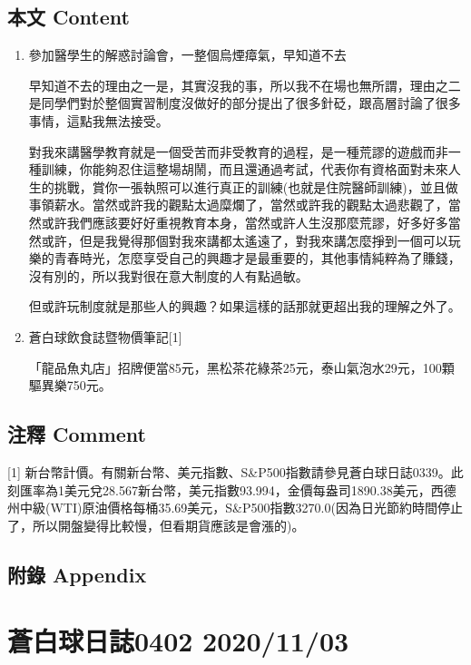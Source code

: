 \documentclass[
]{article}
\begin{document}
\hypertarget{ux672cux6587-content-1}{%
\subsection{本文 Content}\label{ux672cux6587-content-1}}

\begin{enumerate}
\def\labelenumi{\arabic{enumi}.}
\item
  參加醫學生的解惑討論會，一整個烏煙瘴氣，早知道不去

  早知道不去的理由之一是，其實沒我的事，所以我不在場也無所謂，理由之二是同學們對於整個實習制度沒做好的部分提出了很多針砭，跟高層討論了很多事情，這點我無法接受。

  對我來講醫學教育就是一個受苦而非受教育的過程，是一種荒謬的遊戲而非一種訓練，你能夠忍住這整場胡鬧，而且還通過考試，代表你有資格面對未來人生的挑戰，賞你一張執照可以進行真正的訓練(也就是住院醫師訓練)，並且做事領薪水。當然或許我的觀點太過糜爛了，當然或許我的觀點太過悲觀了，當然或許我們應該要好好重視教育本身，當然或許人生沒那麼荒謬，好多好多當然或許，但是我覺得那個對我來講都太遙遠了，對我來講怎麼掙到一個可以玩樂的青春時光，怎麼享受自己的興趣才是最重要的，其他事情純粹為了賺錢，沒有別的，所以我對很在意大制度的人有點過敏。

  但或許玩制度就是那些人的興趣？如果這樣的話那就更超出我的理解之外了。
\item
  蒼白球飲食誌暨物價筆記{[}1{]}

  「龍品魚丸店」招牌便當85元，黑松茶花綠茶25元，泰山氣泡水29元，100顆驅異樂750元。
\end{enumerate}

\hypertarget{ux6ce8ux91cb-comment-1}{%
\subsection{注釋 Comment}\label{ux6ce8ux91cb-comment-1}}

{[}1{]}
新台幣計價。有關新台幣、美元指數、S\&P500指數請參見蒼白球日誌0339。此刻匯率為1美元兌28.567新台幣，美元指數93.994，金價每盎司1890.38美元，西德州中級(WTI)原油價格每桶35.69美元，S\&P500指數3270.0(因為日光節約時間停止了，所以開盤變得比較慢，但看期貨應該是會漲的)。

\hypertarget{ux9644ux9304-appendix-1}{%
\subsection{附錄 Appendix}\label{ux9644ux9304-appendix-1}}

\hypertarget{ux84bcux767dux7403ux65e5ux8a8c0402-20201103}{%
\section{蒼白球日誌0402
2020/11/03}\label{ux84bcux767dux7403ux65e5ux8a8c0402-20201103}}
\end{document}
